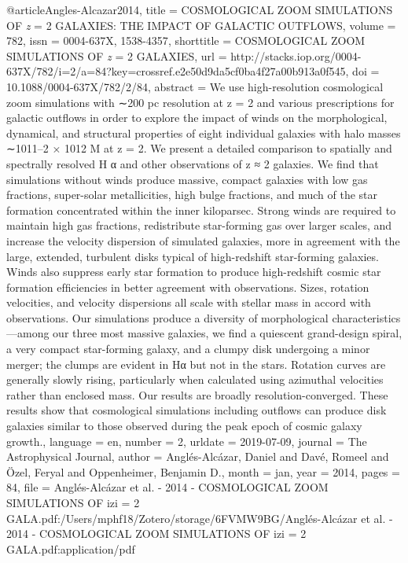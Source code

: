 {@article{Angles-Alcazar2014,
	title = {{COSMOLOGICAL} {ZOOM} {SIMULATIONS} {OF} \textit{z} = 2 {GALAXIES}: {THE} {IMPACT} {OF} {GALACTIC} {OUTFLOWS}},
	volume = {782},
	issn = {0004-637X, 1538-4357},
	shorttitle = {{COSMOLOGICAL} {ZOOM} {SIMULATIONS} {OF} \textit{z} = 2 {GALAXIES}},
	url = {http://stacks.iop.org/0004-637X/782/i=2/a=84?key=crossref.e2e50d9da5cf0ba4f27a00b913a0f545},
	doi = {10.1088/0004-637X/782/2/84},
	abstract = {We use high-resolution cosmological zoom simulations with ∼200 pc resolution at z = 2 and various prescriptions for galactic outﬂows in order to explore the impact of winds on the morphological, dynamical, and structural properties of eight individual galaxies with halo masses ∼1011–2 × 1012 M at z = 2. We present a detailed comparison to spatially and spectrally resolved H α and other observations of z ≈ 2 galaxies. We ﬁnd that simulations without winds produce massive, compact galaxies with low gas fractions, super-solar metallicities, high bulge fractions, and much of the star formation concentrated within the inner kiloparsec. Strong winds are required to maintain high gas fractions, redistribute star-forming gas over larger scales, and increase the velocity dispersion of simulated galaxies, more in agreement with the large, extended, turbulent disks typical of high-redshift star-forming galaxies. Winds also suppress early star formation to produce high-redshift cosmic star formation efﬁciencies in better agreement with observations. Sizes, rotation velocities, and velocity dispersions all scale with stellar mass in accord with observations. Our simulations produce a diversity of morphological characteristics—among our three most massive galaxies, we ﬁnd a quiescent grand-design spiral, a very compact star-forming galaxy, and a clumpy disk undergoing a minor merger; the clumps are evident in Hα but not in the stars. Rotation curves are generally slowly rising, particularly when calculated using azimuthal velocities rather than enclosed mass. Our results are broadly resolution-converged. These results show that cosmological simulations including outﬂows can produce disk galaxies similar to those observed during the peak epoch of cosmic galaxy growth.},
	language = {en},
	number = {2},
	urldate = {2019-07-09},
	journal = {The Astrophysical Journal},
	author = {Anglés-Alcázar, Daniel and Davé, Romeel and Özel, Feryal and Oppenheimer, Benjamin D.},
	month = jan,
	year = {2014},
	pages = {84},
	file = {Anglés-Alcázar et al. - 2014 - COSMOLOGICAL ZOOM SIMULATIONS OF izi = 2 GALA.pdf:/Users/mphf18/Zotero/storage/6FVMW9BG/Anglés-Alcázar et al. - 2014 - COSMOLOGICAL ZOOM SIMULATIONS OF izi = 2 GALA.pdf:application/pdf}
}


}
